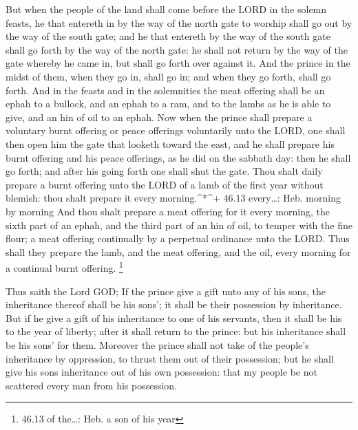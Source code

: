  But when the people of the land shall come before the LORD
in the solemn feasts, he that entereth in by the way of the north gate
to worship shall go out by the way of the south gate; and he that
entereth by the way of the south gate shall go forth by the way of the
north gate: he shall not return by the way of the gate whereby he came
in, but shall go forth over against it.  And the prince in
the midst of them, when they go in, shall go in; and when they go forth,
shall go forth.  And in the feasts and in the solemnities
the meat offering shall be an ephah to a bullock, and an ephah to a ram,
and to the lambs as he is able to give, and an hin of oil to an ephah.
 Now when the prince shall prepare a voluntary burnt
offering or peace offerings voluntarily unto the LORD, one shall then
open him the gate that looketh toward the east, and he shall prepare his
burnt offering and his peace offerings, as he did on the sabbath day:
then he shall go forth; and after his going forth one shall shut the
gate.  Thou shalt daily prepare a burnt offering unto the
LORD of a lamb of the first year without blemish: thou shalt prepare it
every morning.\^{}*\^{}+ 46.13 every\ldots: Heb. morning by morning
 And thou shalt prepare a meat offering for it every
morning, the sixth part of an ephah, and the third part of an hin of
oil, to temper with the fine flour; a meat offering continually by a
perpetual ordinance unto the LORD.  Thus shall they prepare
the lamb, and the meat offering, and the oil, every morning for a
continual burnt offering. \footnote{46.13 of the\ldots: Heb. a son of
  his year}

 Thus saith the Lord GOD; If the prince give a gift unto
any of his sons, the inheritance thereof shall be his sons'; it shall be
their possession by inheritance.  But if he give a gift of
his inheritance to one of his servants, then it shall be his to the year
of liberty; after it shall return to the prince: but his inheritance
shall be his sons' for them.  Moreover the prince shall not
take of the people's inheritance by oppression, to thrust them out of
their possession; but he shall give his sons inheritance out of his own
possession: that my people be not scattered every man from his
possession.

